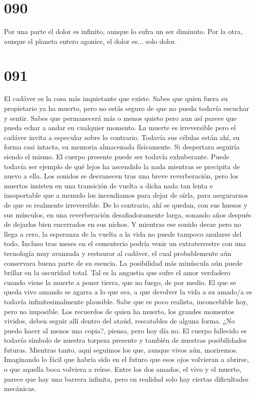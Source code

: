 \documentclass[a4paper,11pt,openright,twocolumn]{book}
\begin{document}
\section*{090}

Por una parte el dolor es infinito, aunque lo sufra un ser diminuto. Por la otra, aunque el planeta
entero agonice, el dolor es... solo dolor. 

\section*{091}

El cadáver es la cosa más inquietante que existe. Sabes que quien fuera su propietario ya ha muerto, pero
no estás seguro de que no pueda todavía escuchar y sentir. Sabes que permanecerá más o menos quieto pero aun así
parece que pueda echar a andar en cualquier momento. La muerte es irreversible pero el cadáver invita a especular
sobre lo contrario. Todavía sus células están ahí, su forma casi intacta, su memoria almacenada físicamente. Si
despertara seguiría siendo el mismo. El cuerpo presente puede ser todavía exhuberante. Puede todavía ser
ejemplo de qué lejos ha ascendido la nada mientras se precipita de nuevo a ella. Los sonidos se desvanecen
tras una breve reverberación, pero los muertos insisten en una transición de vuelta a dicha nada tan lenta e insoportable
que a menudo los incendiamos para dejar de oírla, para asegurarnos de que es realmente irreversible.
De lo contrario, ahí se quedan, con sus huesos y sus músculos, en una reverberación desafiadoramente larga,
sonando años después de dejarlos bien encerrados en sus nichos. Y mientras ese sonido decae pero no llega
a cero, la esperanza de la vuelta a la vida no puede tampoco anularse del todo. Incluso tras meses en 
el cementerio podría venir un extraterrestre con una tecnología muy avanzada y restaurar al cadáver, el cual
probablemente aún conservara buena parte de su esencia. La posibilidad más minúscula aún puede brillar
en la oscuridad total. Tal es la angustia que sufre el amor verdadero cuando viene la muerte a poner
tierra, que no fuego, de por medio. El que se queda vivo amando se agarra a lo que sea, a que devolver la vida
a su amado/a es todavía infinitesimalmente plausible. Sabe que es poco realista, inconcebible hoy, pero no
imposible. Los recuerdos de quien ha muerto, los grandes momentos vividos, deben seguir allí dentro del
ataúd, rescatables de alguna forma. ¿No puedo hacer al menos una copia?, piensa, pero hoy día no. El cuerpo
fallecido es todavía símbolo de nuestra torpeza presente y también de nuestras posibilidades futuras. Mientras
tanto, aquí seguimos los que, aunque vivos aún, moriremos. Imaginando lo fácil que habría sido en el futuro que
esos ojos volvieran a abrirse, o que aquella boca volviera a reírse. Entre los dos amados, el vivo y el muerto,
parece que hay una barrera infinita, pero en realidad solo hay ciertas dificultades mecánicas.
\end{document}
